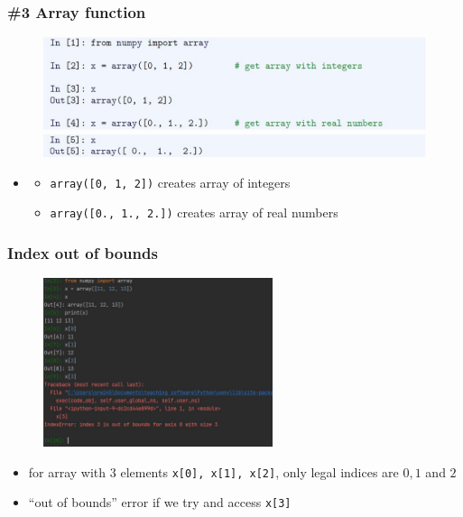 \documentclass[english,14pt]{beamer}
\newcommand\green[1]{{\color{green} #1}}
\newcommand{\cmark}{\ding{51}}%
\begin{document}

\begin{frame}[fragile]

\frametitle{\#3 Array function}

\begin{figure}[ht]
	\centering
	\includegraphics[width=\textwidth]{figures/LLp49a}
	\includegraphics[width=\textwidth]{figures/LLp50}
\end{figure}

\begin{itemize}
	\item[]
	\begin{itemize}
		\item \texttt{array([0, 1, 2])} creates array of integers
		\item \texttt{array([0., 1., 2.])} creates array of real numbers
	\end{itemize}
\end{itemize}

\end{frame}


\begin{frame}[fragile]

\frametitle{Index out of bounds}

\begin{figure}[ht]
	\centering
	\includegraphics[width=0.6\textwidth]{figures/LLp50PyCharm}
\end{figure}
\vspace*{-5mm}
\begin{itemize}
	\item for array with 3 elements \texttt{x[0], x[1], x[2]}, only legal indices are $0,1$ and $2$
	\item[\green{\cmark}] ``out of bounds'' error if we try and access \texttt{x[3]}
\end{itemize}

\end{frame}
\end{document}
